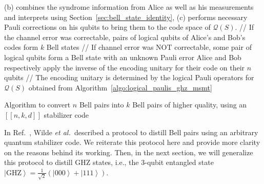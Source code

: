 \documentclass[journal,onecolumn]{IEEEtran}
\newcommand{\dket}[1]{\left\lvert #1 \right\rangle}
\newcommand{\etal}{\emph{et al.~}}
\newcommand{\llbr}{[\![}
\newcommand{\rrbr}{]\!]}
\begin{document}
\begin{algorithm}[b]
{%
(b) combines the syndrome information from Alice as well as his measurements and interprets using Section~\ref{sec:bell_state_identity}, \;
(c) performs necessary Pauli corrections on his qubits to bring them to the code space of $\mathcal{Q}(S)$. \;
  \; 
 // If the channel error was correctable, pairs of logical qubits of Alice's and Bob's codes form $k$ Bell states \;
 // If channel error was NOT correctable, some pair of logical qubits form a Bell state with an unknown Pauli error \;
 Alice and Bob respectively apply the inverse of the encoding unitary for their code on their $n$ qubits \;
 // The encoding unitary is determined by the logical Pauli operators for $\mathcal{Q}(S)$ obtained from Algorithm~\ref{algo:logical_paulis_ghz_msmt}
}
  \caption{Algorithm to convert $n$ Bell pairs into $k$ Bell pairs of higher quality, using an $\llbr n,k,d \rrbr$ stabilizer code}
 \label{algo:algo_bell}
\end{algorithm}




In Ref.~\cite{Wilde-isit10}, Wilde \etal described a protocol to distill Bell pairs using an arbitrary quantum stabilizer code.
We reiterate this protocol here and provide more clarity on the reasons behind its working.
Then, in the next section, we will generalize this protocol to distill GHZ states, i.e., the $3$-qubit entangled state $\dket{\text{GHZ}} = \frac{1}{\sqrt{2}} \left( \dket{000} + \dket{111} \right)$.
\end{document}

